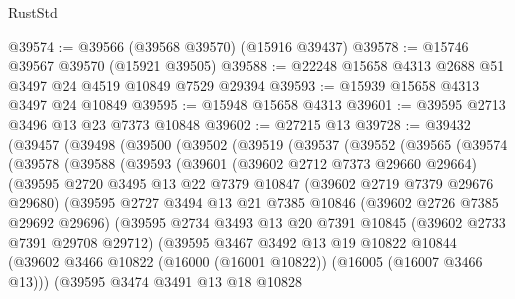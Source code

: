\begin{lexlean}{RustStd}
\begin{coremodule}
@39574 := @39566 (@39568 @39570) (@15916 @39437)
@39578 := @15746 @39567 @39570 (@15921 @39505)
@39588 := @22248 @15658 @4313 @2688 @51 @3497 @24 @4519 @10849 @7529 @29394
@39593 := @15939 @15658 @4313 @3497 @24 @10849
@39595 := @15948 @15658 @4313
@39601 := @39595 @2713 @3496 @13 @23 @7373 @10848
@39602 := @27215 @13
@39728 := @39432
    (@39457
      (@39498
        (@39500
          (@39502
            (@39519
              (@39537
                (@39552
                  (@39565
                    (@39574
                      (@39578
                        (@39588
                          (@39593
                            (@39601
                              (@39602 @2712 @7373 @29660 @29664)
                              (@39595
                                @2720
                                @3495
                                @13
                                @22
                                @7379
                                @10847
                                (@39602 @2719 @7379 @29676 @29680)
                                (@39595
                                  @2727
                                  @3494
                                  @13
                                  @21
                                  @7385
                                  @10846
                                  (@39602 @2726 @7385 @29692 @29696)
                                  (@39595
                                    @2734
                                    @3493
                                    @13
                                    @20
                                    @7391
                                    @10845
                                    (@39602 @2733 @7391 @29708 @29712)
                                    (@39595
                                      @3467
                                      @3492
                                      @13
                                      @19
                                      @10822
                                      @10844
                                      (@39602
                                        @3466
                                        @10822
                                        (@16000 (@16001 @10822))
                                        (@16005 (@16007 @3466 @13)))
                                      (@39595
                                        @3474
                                        @3491
                                        @13
                                        @18
                                        @10828

\end{coremodule}
\end{lexlean}
